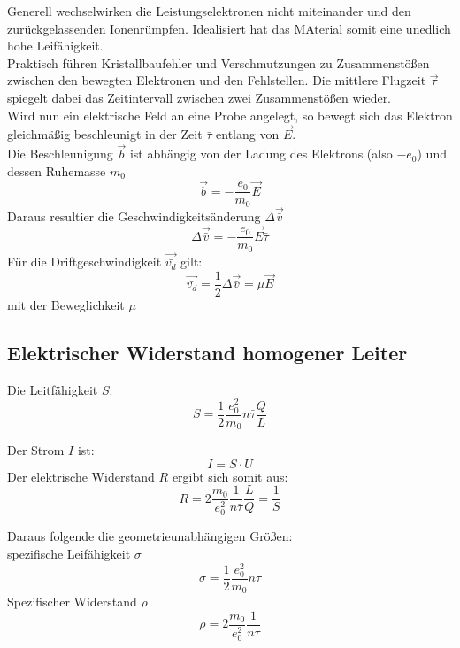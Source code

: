 Generell wechselwirken die Leistungselektronen nicht miteinander und den zurückgelassenden Ionenrümpfen.
Idealisiert hat das MAterial somit eine unedlich hohe Leifähigkeit.\\
Praktisch führen Kristallbaufehler und Verschmutzungen zu Zusammenstößen zwischen den bewegten Elektronen und den Fehlstellen.
Die mittlere Flugzeit $\vec{\tau}$ spiegelt dabei das Zeitintervall zwischen zwei Zusammenstößen wieder.\\
Wird nun ein elektrische Feld an eine Probe angelegt, so bewegt sich das Elektron gleichmäßig beschleunigt in der Zeit $\bar{\tau}$
entlang von $\vec{E}$.\\
Die Beschleunigung $\vec{b}$ ist abhängig von der Ladung des Elektrons (also $-e_0$) und dessen Ruhemasse $m_0$ 
\begin{equation}
    \vec{b}=-\frac{e_0}{m_0}\vec{E}
\end{equation}
Daraus resultier die Geschwindigkeitsänderung $\Delta \vec{\bar{v}}$
\begin{equation}
    \Delta \vec{\bar{v}}=-\frac{e_0}{m_0}\vec{E}\bar{\tau}
\end{equation}
Für die Driftgeschwindigkeit $\vec{\bar{v_d}}$ gilt:
\begin{equation}
    \vec{\bar{v_d}}=\frac{1}{2} \Delta \vec{\bar{v}}=\mu\vec{E}
\end{equation}
mit der Beweglichkeit $\mu$

\subsection{Elektrischer Widerstand homogener Leiter}
Die Leitfähigkeit $S$:
\begin{equation}
    S=\frac{1}{2}\frac{e_0^2}{m_0}n\bar{\tau}\frac{Q}{L}
\end{equation}

Der Strom $I$ ist:
\begin{equation}
    I=S \cdot U
\end{equation}
Der elektrische Widerstand $R$ ergibt sich somit aus:
\begin{equation}
    R=2\frac{m_0}{e_0^2}\frac{1}{n\bar{\tau}}\frac{L}{Q}=\frac{1}{S}
\end{equation}

Daraus folgende die geometrieunabhängigen Größen:\\
spezifische Leifähigkeit $\sigma$
\begin{equation}
    \sigma = \frac{1}{2}\frac{e_0^2}{m_0}n\bar{\tau}
\end{equation}
Spezifischer Widerstand $\rho$
\begin{equation}
    \rho = 2 \frac{m_0}{e_0^2}\frac{1}{n\bar{\tau}}
\end{equation}



